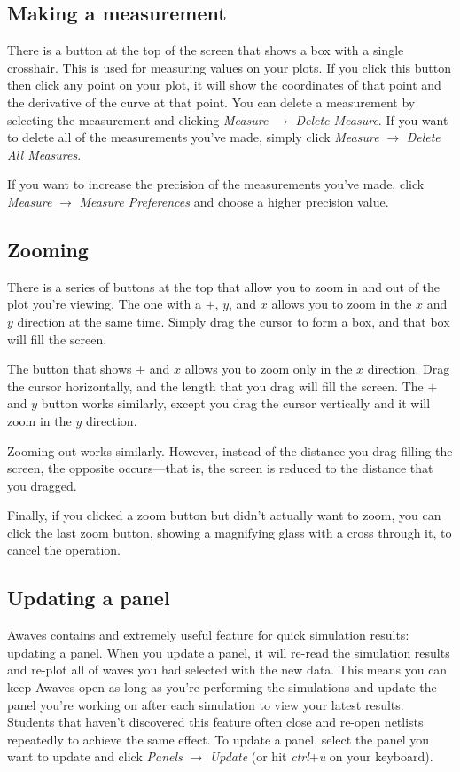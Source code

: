 \documentclass{article}
\begin{document}
\subsection{Making a measurement}

There is a button at the top of the screen that shows a box with a single crosshair. This is used for measuring values on your plots. If you click this button then click any point on your plot, it will show the coordinates of that point and the derivative of the curve at that point. You can delete a measurement by selecting the measurement and clicking \textit{Measure} $\rightarrow$ \textit{Delete Measure}. If you want to delete all of the measurements you've made, simply click \textit{Measure} $\rightarrow$ \textit{Delete All Measures}.

If you want to increase the precision of the measurements you've made, click \textit{Measure} $\rightarrow$ \textit{Measure Preferences} and choose a higher precision value.

\subsection{Zooming}

There is a series of buttons at the top that allow you to zoom in and out of the plot you're viewing. The one with a $+$, $y$, and $x$ allows you to zoom in the $x$ and $y$ direction at the same time. Simply drag the cursor to form a box, and that box will fill the screen.

The button that shows $+$ and $x$ allows you to zoom only in the $x$ direction. Drag the cursor horizontally, and the length that you drag will fill the screen. The $+$ and $y$ button works similarly, except you drag the cursor vertically and it will zoom in the $y$ direction.

Zooming out works similarly. However, instead of the distance you drag filling the screen, the opposite occurs---that is, the screen is reduced to the distance that you dragged.

Finally, if you clicked a zoom button but didn't actually want to zoom, you can click the last zoom button, showing a magnifying glass with a cross through it, to cancel the operation.

\subsection{Updating a panel}

Awaves contains and extremely useful feature for quick simulation results: updating a panel. When you update a panel, it will re-read the simulation results and re-plot all of waves you had selected with the new data. This means you can keep Awaves open as long as you're performing the simulations and update the panel you're working on after each simulation to view your latest results. Students that haven't discovered this feature often close and re-open netlists repeatedly to achieve the same effect. To update a panel, select the panel you want to update and click \textit{Panels} $\rightarrow$ \textit{Update} (or hit \textit{ctrl}+\textit{u} on your keyboard).
\end{document}
